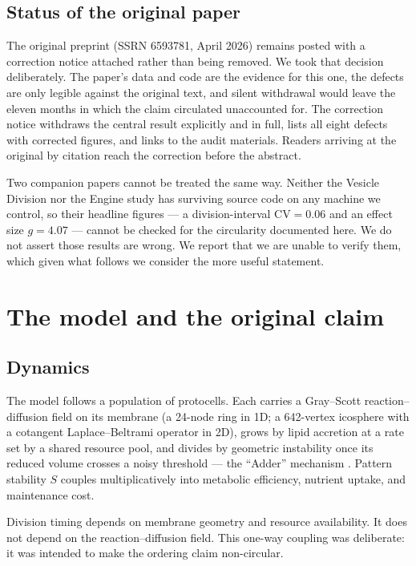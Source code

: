 \documentclass[11pt,letterpaper]{article}
\begin{document}
\subsection{Status of the original paper}

The original preprint (SSRN 6593781, April 2026) remains posted with a
correction notice attached rather than being removed. We took that
decision deliberately. The paper's data and code are the evidence for
this one, the defects are only legible against the original text, and
silent withdrawal would leave the eleven months in which the claim
circulated unaccounted for. The correction notice withdraws the central
result explicitly and in full, lists all eight defects with corrected
figures, and links to the audit materials. Readers arriving at the
original by citation reach the correction before the abstract.

Two companion papers cannot be treated the same way. Neither the
Vesicle Division nor the Engine study has surviving source code on any
machine we control, so their headline figures --- a division-interval
$\mathrm{CV} = 0.06$ and an effect size $g = 4.07$ --- cannot be checked
for the circularity documented here. We do not assert those results are
wrong. We report that we are unable to verify them, which given what
follows we consider the more useful statement.

\section{The model and the original claim}

\subsection{Dynamics}

The model follows a population of protocells. Each carries a
Gray--Scott reaction--diffusion field \citep{gray1983,pearson1993} on
its membrane (a 24-node ring in 1D; a 642-vertex icosphere with a
cotangent Laplace--Beltrami operator in 2D), grows by lipid accretion at
a rate set by a shared resource pool, and divides by geometric
instability once its reduced volume crosses a noisy threshold --- the
``Adder'' mechanism \citep{taheri2015,campos2014}. Pattern
stability $S$ couples multiplicatively into metabolic efficiency,
nutrient uptake, and maintenance cost.

Division timing depends on membrane geometry and resource availability.
It does not depend on the reaction--diffusion field. This one-way
coupling was deliberate: it was intended to make the ordering claim
non-circular.
\end{document}
